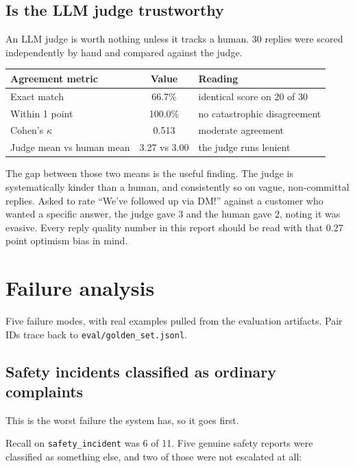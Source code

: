 \documentclass[11pt,a4paper]{article}
\begin{document}
\subsection{Is the LLM judge trustworthy}

An LLM judge is worth nothing unless it tracks a human. 30 replies were scored
independently by hand and compared against the judge.

\begin{table}[h]
\centering
\begin{tabular}{lcl}
\toprule
\textbf{Agreement metric} & \textbf{Value} & \textbf{Reading} \\
\midrule
Exact match & 66.7\% & identical score on 20 of 30 \\
Within 1 point & 100.0\% & no catastrophic disagreement \\
Cohen's $\kappa$ & 0.513 & moderate agreement \\
Judge mean vs human mean & 3.27 vs 3.00 & the judge runs lenient \\
\bottomrule
\end{tabular}
\end{table}

The gap between those two means is the useful finding. The judge is systematically
kinder than a human, and consistently so on vague, non-committal replies. Asked to rate
``We've followed up via DM!'' against a customer who wanted a specific answer, the judge
gave 3 and the human gave 2, noting it was evasive. Every reply quality number in this
report should be read with that 0.27 point optimism bias in mind.

\section{Failure analysis}

Five failure modes, with real examples pulled from the evaluation artifacts. Pair IDs
trace back to \texttt{eval/golden\_set.jsonl}.

\subsection{Safety incidents classified as ordinary complaints}

This is the worst failure the system has, so it goes first.

Recall on \texttt{safety\_incident} was 6 of 11. Five genuine safety reports were
classified as something else, and two of those were not escalated at all:
\end{document}
